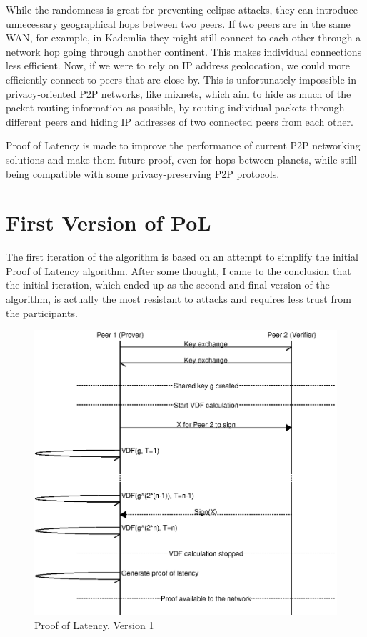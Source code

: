 While the randomness is great for preventing eclipse attacks, they can introduce unnecessary geographical hops between two peers. If two peers are in the same WAN, for example, in Kademlia they might still connect to each other through a network hop going through another continent. This makes individual connections less efficient.
Now, if we were to rely on IP address geolocation, we could more efficiently connect to peers that are close-by. This is unfortunately impossible in privacy-oriented P2P networks, like mixnets, which aim to hide as much of the packet routing information as possible, by routing individual packets through different peers and hiding IP addresses of two connected peers from each other.\cite{harry_halpin_nym-litepaperpdf_nodate}

Proof of Latency is made to improve the performance of current P2P networking solutions and make them future-proof, even for hops between planets, while still being compatible with some privacy-preserving P2P protocols.

\section{First Version of PoL}
The first iteration of the algorithm is based on an attempt to simplify the initial Proof of Latency algorithm. After some thought, I came to the conclusion that the initial iteration, which ended up as the second and final version of the algorithm, is actually the most resistant to attacks and requires less trust from the participants.
\begin{figure}
	\includegraphics[width=\textwidth]{pictures/pol1_diagram.eps}
	\caption{Proof of Latency, Version 1}
	\label{PoL Diagram 1}
\end{figure}

